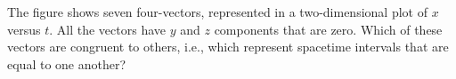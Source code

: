 The figure shows seven four-vectors, represented in a two-dimensional
plot of $x$ versus $t$. All the vectors have $y$ and $z$ components
that are zero. Which of these vectors are congruent to others, i.e.,
which represent spacetime intervals that are equal to one another?
